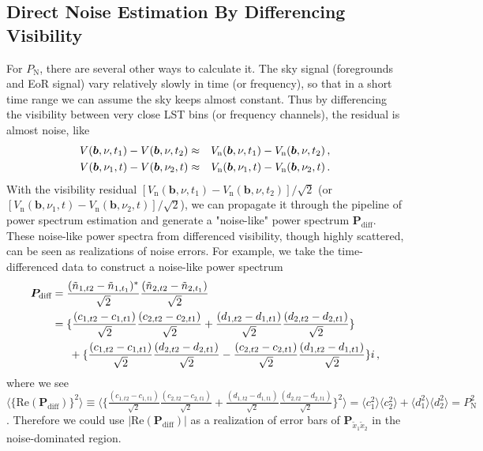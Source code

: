 \documentclass[12pt,a4paper]{article}
\begin{document}
\subsection{Direct Noise Estimation By Differencing Visibility}
\label{subsubsec:diff}
For $P_\text{N}$, there are several other ways to calculate it. The sky signal (foregrounds and EoR signal) vary relatively slowly in time (or frequency), so that in a short time range we can assume the sky keeps almost constant. Thus by differencing the visibility between very close LST bins (or frequency channels), the residual is almost noise, like
\begin{eqnarray}
    V(\bm{b},\nu,t_1) -  V(\bm{b},\nu,t_2) & \approx & V_\text{n}(\bm{b},\nu,t_1) -  V_\text{n}(\bm{b},\nu,t_2) \,, \notag \\
    V(\bm{b},\nu_1,t) -  V(\bm{b},\nu_2,t) & \approx & V_\text{n}(\bm{b},\nu_1, t) -  V_\text{n}(\bm{b},\nu_2, t) \,.\notag \\
\end{eqnarray}
With the visibility residual $[V_\text{n}(\bm{b},\nu,t_1) -  V_\text{n}(\bm{b},\nu,t_2)]/\sqrt{2}$ (or $[V_\text{n}(\bm{b},\nu_1, t) -  V_\text{n}(\bm{b},\nu_2, t)]/\sqrt{2}$), we can propagate it through the pipeline of power spectrum estimation and generate a "noise-like" power spectrum $\bm{P}_\text{diff}$. These noise-like power spectra from differenced visibility, though highly scattered, can be seen as realizations of noise errors. For example, we take the time-differenced data to construct a noise-like power spectrum
\begin{align}
\label{eq:pnn}
    \bm{P}_\text{diff} & =\frac{(\tilde{n}_{1,t2} - \tilde{n}_{1,t_1})^*}{\sqrt{2}}\frac{(\tilde{n}_{2,t2} - \tilde{n}_{2,t_1})}{\sqrt{2}} \notag \\
    & = \{\frac{(c_{1,t2}-c_{1,t1})}{\sqrt{2}}\frac{(c_{2,t2}-c_{2,t1})}{\sqrt{2}} + \frac{(d_{1,t2}-d_{1,t1})}{\sqrt{2}}\frac{(d_{2,t2}-d_{2,t1})}{\sqrt{2}}\} \notag \\
    & \phantom{==} + \{\frac{(c_{1,t2}-c_{1,t1})}{\sqrt{2}}\frac{(d_{2,t2}-d_{2,t1})}{\sqrt{2}}-\frac{(c_{2,t2}-c_{2,t1})}{\sqrt{2}}\frac{(d_{1,t2}-d_{1,t1})}{\sqrt{2}}\}i \,,
\end{align} 
where we see $\langle\{\text{Re}(\bm{P}_\text{diff})\}^2 \rangle \equiv \langle \{\frac{(c_{1,t2}-c_{1,t1})}{\sqrt{2}}\frac{(c_{2,t2}-c_{2,t1})}{\sqrt{2}} + \frac{(d_{1,t2}-d_{1,t1})}{\sqrt{2}}\frac{(d_{2,t2}-d_{2,t1})}{\sqrt{2}}\}^2 \rangle = \langle c_1^2\rangle\langle c_2^2\rangle + \langle d_1^2\rangle\langle d_2^2\rangle = P_\text{N}^2$. Therefore we could use $|\text{Re}(\bm{P}_\text{diff})|$ as a realization of error bars of $\bm{P}_{\tilde{x}_1\tilde{x}_2}$ in the noise-dominated region. 
\end{document}
